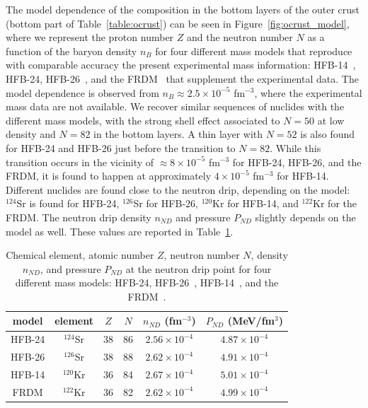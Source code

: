 The model dependence of the composition in the bottom layers of the outer crust 
(bottom part of Table~\ref{table:ocrust}) can be seen in
Figure~\ref{fig:ocrust_model}, where we represent the proton number $Z$ and the
neutron number $N$ as a function of the baryon density $n_B$ for four different
mass models that reproduce with comparable accuracy the present experimental
mass information: HFB-14~\cite{Goriely2007}, HFB-24, HFB-26~\cite{Goriely2013}, 
and the FRDM~\cite{Moller1995} that supplement the experimental data. The model
dependence is observed from $n_B \approx 2.5\times 10^{-5}$ fm$^{-3}$, where
the experimental mass data are not available. We 
recover similar sequences of nuclides with the different mass models, with
the strong shell effect associated to $N=50$ at low density and $N=82$ in the
bottom layers. A thin layer with $N=52$ is also found for HFB-24 and HFB-26 just before the
transition to $N=82$. While this transition occurs in the vicinity of $\approx 8\times
10^{-5}$ fm$^{-3}$ for HFB-24, HFB-26, and the FRDM, it is found to happen at
approximately $4\times 10^{-5}$ fm$^{-3}$ for HFB-14. Different nuclides are 
found close to the neutron drip, depending on the model: $^{124}$Sr is found for
HFB-24, $^{126}$Sr for HFB-26, $^{120}$Kr for HFB-14, and $^{122}$Kr for the FRDM. 
The neutron drip density $n_{ND}$ and pressure $P_{ND}$ slightly depends on 
the model as well. These values are reported in Table~\ref{table:drip}.

\begin{table}
\begin{center}
\begin{tabular}{cccccc} 
  \toprule
  \toprule
  model & element & $Z$ & $N$ & $n_{ND}$ (fm$^{-3}$) & $P_{ND}$ (MeV/fm$^3$)\\
  \midrule
  HFB-24 & $^{124}$Sr & 38 & 86 & $2.56\times 10^{-4}$ & $4.87\times 10^{-4}$\\
  HFB-26 & $^{126}$Sr & 38 & 88 & $2.62\times 10^{-4}$ & $4.91\times 10^{-4}$\\
  HFB-14 & $^{120}$Kr & 36 & 84 & $2.67\times 10^{-4}$ & $5.01\times 10^{-4}$\\
  FRDM   & $^{122}$Kr & 36 & 82 & $2.62\times 10^{-4}$ & $4.99\times 10^{-4}$\\
  \bottomrule
  \bottomrule
\end{tabular}
\end{center}
\caption[Ground state of matter at the neutron-drip point]{Chemical element, atomic 
  number $Z$, neutron number $N$, density
$n_{ND}$, and pressure $P_{ND}$ at the neutron drip point for four different
mass models: HFB-24, HFB-26~\cite{Goriely2013}, HFB-14~\cite{Goriely2007}, and
the FRDM~\cite{Moller1995}.}\label{table:drip} 
\end{table}

